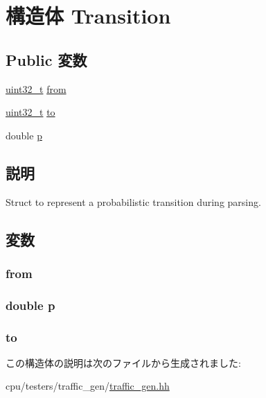 \hypertarget{structTrafficGen_1_1Transition}{
\section{構造体 Transition}
\label{structTrafficGen_1_1Transition}
}
\subsection*{Public 変数}
\begin{DoxyCompactItemize}
\item 
\hyperlink{Type_8hh_a435d1572bf3f880d55459d9805097f62}{uint32\_\-t} \hyperlink{structTrafficGen_1_1Transition_a90c58c32e2a10d84faa3953b5b79f96c}{from}
\item 
\hyperlink{Type_8hh_a435d1572bf3f880d55459d9805097f62}{uint32\_\-t} \hyperlink{structTrafficGen_1_1Transition_a6b12453755df83a8ad128072c21009eb}{to}
\item 
double \hyperlink{structTrafficGen_1_1Transition_aace2d484b0e3651abd108f04803d316c}{p}
\end{DoxyCompactItemize}


\subsection{説明}
Struct to represent a probabilistic transition during parsing. 

\subsection{変数}
\hypertarget{structTrafficGen_1_1Transition_a90c58c32e2a10d84faa3953b5b79f96c}{
\subsubsection[{from}]{ {\bf from}}}
\label{structTrafficGen_1_1Transition_a90c58c32e2a10d84faa3953b5b79f96c}
\hypertarget{structTrafficGen_1_1Transition_aace2d484b0e3651abd108f04803d316c}{
\subsubsection[{p}]{\setlength{\rightskip}{0pt plus 5cm}double {\bf p}}}
\label{structTrafficGen_1_1Transition_aace2d484b0e3651abd108f04803d316c}
\hypertarget{structTrafficGen_1_1Transition_a6b12453755df83a8ad128072c21009eb}{
\subsubsection[{to}]{ {\bf to}}}
\label{structTrafficGen_1_1Transition_a6b12453755df83a8ad128072c21009eb}


この構造体の説明は次のファイルから生成されました:\begin{DoxyCompactItemize}
\item 
cpu/testers/traffic\_\-gen/\hyperlink{traffic__gen_8hh}{traffic\_\-gen.hh}\end{DoxyCompactItemize}
